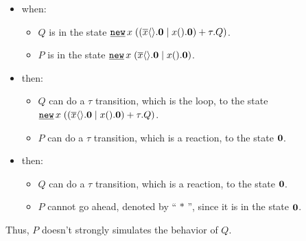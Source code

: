 \begin{itemize}
\item when:
	\begin{itemize}
	\item $Q$ is in the state $\procres{x}{(\procchoice{(\procpar{\out{x}{}.\proczero}{\inp{x}{}.\proczero})}{\tau.Q})}$.
	\item $P$ is in the state $\procres{x}{(\procpar{\out{x}{}.\proczero}{\inp{x}{}.\proczero})}$.
	\end{itemize}

\item then:
	\begin{itemize}
	\item $Q$ can do a $\tau$ transition, which is the loop, to the state $\procres{x}{(\procchoice{(\procpar{\out{x}{}.\proczero}{\inp{x}{}.\proczero})}{\tau.Q})}$.
	\item $P$ can do a $\tau$ transition, which is a reaction, to the state $\mathbf{0}$.
	\end{itemize}

\item then:
	\begin{itemize}
	\item $Q$ can do a $\tau$ transition, which is a reaction, to the state $\mathbf{0}$.
	\item $P$ cannot go ahead, denoted by `` $*$ '', since it is in the state $\mathbf{0}$.
	\end{itemize}
\end{itemize}


Thus, $P$ doesn't strongly simulates the behavior of $Q$.

